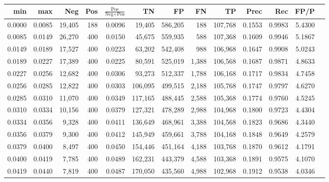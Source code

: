 \begin{tabular}{rrrrrrrrrrrrr}
\toprule
   min &    max &    Neg &   Pos & $\frac{\text{Pos}}{\text{Neg}+\text{Pos}}$ &      TN &      FP &      FN &      TP &   Prec &    Rec &   FP/P \\
\midrule
0.0000 & 0.0085 & 19,405 &   188 &                                     0.0096 &  19,405 & 586,205 &     188 & 107,768 & 0.1553 & 0.9983 & 5.4300 \\
0.0085 & 0.0149 & 26,270 &   400 &                                     0.0150 &  45,675 & 559,935 &     588 & 107,368 & 0.1609 & 0.9946 & 5.1867 \\
0.0149 & 0.0189 & 17,527 &   400 &                                     0.0223 &  63,202 & 542,408 &     988 & 106,968 & 0.1647 & 0.9908 & 5.0243 \\
0.0189 & 0.0227 & 17,389 &   400 &                                     0.0225 &  80,591 & 525,019 &   1,388 & 106,568 & 0.1687 & 0.9871 & 4.8633 \\
0.0227 & 0.0256 & 12,682 &   400 &                                     0.0306 &  93,273 & 512,337 &   1,788 & 106,168 & 0.1717 & 0.9834 & 4.7458 \\
0.0256 & 0.0285 & 12,822 &   400 &                                     0.0303 & 106,095 & 499,515 &   2,188 & 105,768 & 0.1747 & 0.9797 & 4.6270 \\
0.0285 & 0.0310 & 11,070 &   400 &                                     0.0349 & 117,165 & 488,445 &   2,588 & 105,368 & 0.1774 & 0.9760 & 4.5245 \\
0.0310 & 0.0334 & 10,156 &   400 &                                     0.0379 & 127,321 & 478,289 &   2,988 & 104,968 & 0.1800 & 0.9723 & 4.4304 \\
0.0334 & 0.0356 &  9,328 &   400 &                                     0.0411 & 136,649 & 468,961 &   3,388 & 104,568 & 0.1823 & 0.9686 & 4.3440 \\
0.0356 & 0.0379 &  9,300 &   400 &                                     0.0412 & 145,949 & 459,661 &   3,788 & 104,168 & 0.1848 & 0.9649 & 4.2579 \\
0.0379 & 0.0400 &  8,497 &   400 &                                     0.0450 & 154,446 & 451,164 &   4,188 & 103,768 & 0.1870 & 0.9612 & 4.1791 \\
0.0400 & 0.0419 &  7,785 &   400 &                                     0.0489 & 162,231 & 443,379 &   4,588 & 103,368 & 0.1891 & 0.9575 & 4.1070 \\
0.0419 & 0.0440 &  7,819 &   400 &                                     0.0487 & 170,050 & 435,560 &   4,988 & 102,968 & 0.1912 & 0.9538 & 4.0346 \\

\end{tabular}

